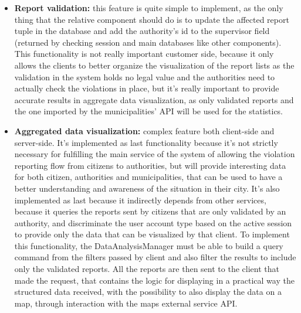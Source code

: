 \begin{itemize}
	\item \textbf{Report validation:} this feature is quite simple to implement, as the only thing that the relative component should do is to update the affected report tuple in the database and add the authority's id to the supervisor field (returned by checking session and main databases like other components). This functionality is not really important customer side, because it only allows the clients to better organize the visualization of the report lists as the validation in the system holds no legal value and the authorities need to actually check the violations in place, but it's really important to provide accurate results in aggregate data visualization, as only validated reports and the one imported by the municipalities' API will be used for the statistics.
	
	\item \textbf{Aggregated data visualization:} complex feature both client-side and server-side. It's implemented as last functionality because it's not strictly necessary for fulfilling the main service of the system of allowing the violation reporting flow from citizens to authorities, but will provide interesting data for both citizen, authorities and municipalities, that can be used to have a better understanding and awareness of the situation in their city. It's also implemented as last because it indirectly depends from other services, because it queries the reports sent by citizens that are only validated by an authority, and discriminate the user account type based on the active session to provide only the data that can be visualized by that client. To implement this functionality, the DataAnalysisManager must be able to build a query command from the filters passed by client and also filter the results to include only the validated reports. All the reports are then sent to the client that made the request, that contains the logic for displaying in a practical way the structured data received, with the possibility to also display the data on a map, through interaction with the maps external service API.
\end{itemize}